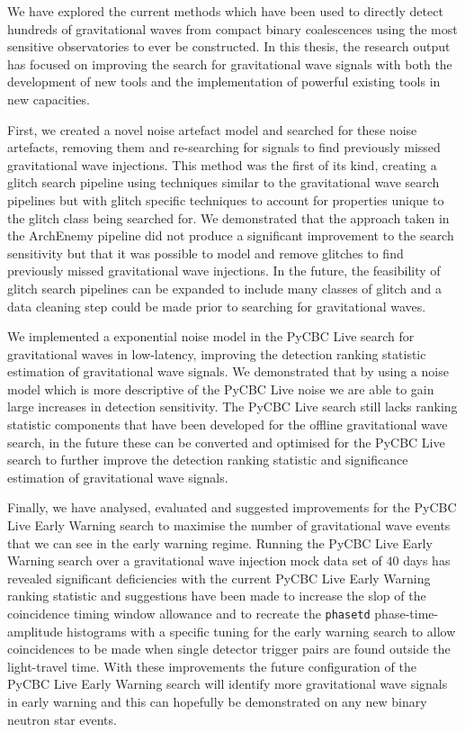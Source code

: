 
We have explored the current methods which have been used to directly detect hundreds of gravitational waves from compact binary coalescences using the most sensitive observatories to ever be constructed. In this thesis, the research output has focused on improving the search for gravitational wave signals with both the development of new tools and the implementation of powerful existing tools in new capacities.

First, we created a novel \scladj noise artefact model and searched for these noise artefacts, removing them and re-searching for signals to find previously missed gravitational wave injections. This method was the first of its kind, creating a glitch search pipeline using techniques similar to the gravitational wave search pipelines but with glitch specific techniques to account for properties unique to the glitch class being searched for. We demonstrated that the approach taken in the ArchEnemy pipeline did not produce a significant improvement to the search sensitivity but that it was possible to model and remove glitches to find previously missed gravitational wave injections. In the future, the feasibility of glitch search pipelines can be expanded to include many classes of glitch and a data cleaning step could be made prior to searching for gravitational waves.

We implemented a exponential noise model in the PyCBC Live search for gravitational waves in low-latency, improving the detection ranking statistic estimation of gravitational wave signals. We demonstrated that by using a noise model which is more descriptive of the PyCBC Live noise we are able to gain large increases in detection sensitivity. The PyCBC Live search still lacks ranking statistic components that have been developed for the offline gravitational wave search, in the future these can be converted and optimised for the PyCBC Live search to further improve the detection ranking statistic and significance estimation of gravitational wave signals.

Finally, we have analysed, evaluated and suggested improvements for the PyCBC Live Early Warning search to maximise the number of gravitational wave events that we can see in the early warning regime. Running the PyCBC Live Early Warning search over a gravitational wave injection mock data set of $40$ days has revealed significant deficiencies with the current PyCBC Live Early Warning ranking statistic and suggestions have been made to increase the slop of the coincidence timing window allowance and to recreate the \texttt{phasetd} phase-time-amplitude histograms with a specific tuning for the early warning search to allow coincidences to be made when single detector trigger pairs are found outside the light-travel time. With these improvements the future configuration of the PyCBC Live Early Warning search will identify more gravitational wave signals in early warning and this can hopefully be demonstrated on any new binary neutron star events.

